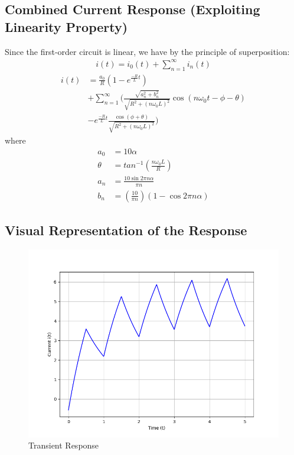 \begin{multicols}{2}
\subsection{Combined Current Response (Exploiting Linearity Property)}
Since the first-order circuit is linear, we have by the principle of superposition:
 \begin{align}
        i(t) = i_0(t)+ \sum_{n=1}^{\infty}i_n(t)
\end{align}
\begin{align}
i(t) &= \frac{a_0}{R} \left(1-e^{\frac{-R}{L}t} \right) \\
&+ \sum_{n=1}^{\infty} \Bigg( \frac{\sqrt{a_n^2+b_n^2}}{\sqrt{R^2+(n\omega_0L)^2}} \cos(n\omega_0t-\phi-\theta) \\
&- e^{\frac{-R}{L}t} \frac{\cos(\phi+\theta)}{\sqrt{R^2+(n\omega_0L)^2}} \Bigg)
\end{align}
where
\begin{align*}
    a_0&=10\alpha\\
    \theta&=tan^{-1}\left(\frac{n\omega_0L}{R}\right)\\
    a_n&=\frac{10 \sin 2 \pi n \alpha}{\pi n} \\
    b_n&=\left( \frac{10}{ \pi n} \right) (1 - \cos 2 \pi n \alpha)
\end{align*}


\subsection{Visual Representation of the Response}
\begin{figure}[H]
  \centering
  \includegraphics[width=\columnwidth]{sections/3_plot.png}
  \caption{Transient Response}
  \end{figure}
\end{multicols}
